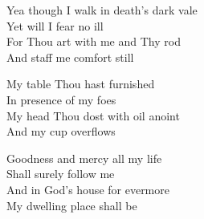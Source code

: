\documentclass{beamer}
\begin{document}
{\begin{frame}{}
\end{frame}

\hypertarget{The Lord's my Shepherd['Psalm 23'](Trad)3}{}
\begin{frame}{}
\fontsize{ 18 }{ 23 }\selectfont

Yea though I walk in death's dark vale\\ 
Yet will I fear no ill\\ 
For Thou art with me and Thy rod\\ 
And staff me comfort still 

\end{frame}

\hypertarget{The Lord's my Shepherd['Psalm 23'](Trad)4}{}
\begin{frame}{}
\fontsize{ 18 }{ 23 }\selectfont

My table Thou hast furnished\\ 
In presence of my foes\\ 
My head Thou dost with oil anoint\\ 
And my cup overflows 

\end{frame}

\hypertarget{The Lord's my Shepherd['Psalm 23'](Trad)5}{}
\begin{frame}{}
\fontsize{ 18 }{ 23 }\selectfont

Goodness and mercy all my life\\ 
Shall surely follow me\\ 
And in God's house for evermore\\ 
My dwelling place shall be 

\end{frame}

}
\end{document}
